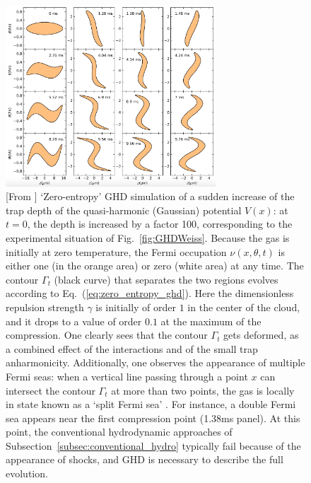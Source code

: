 \documentclass[onecolumn,amsfonts,showpacs,superscriptaddress]{revtex4-1}
\begin{document}
\begin{figure}
    \centering
    \includegraphics[width=0.7\textwidth]{figures/fermi_contour.png}
    \caption{[From \citep{malvania2020generalized}] `Zero-entropy' GHD simulation of a sudden increase of the trap depth of the quasi-harmonic (Gaussian) potential $V(x)$: at $t=0$, the depth is increased by a factor 100, corresponding to the experimental situation of Fig.~\ref{fig:GHDWeiss}. Because the gas is initially at zero temperature, the Fermi occupation $\nu(x,\theta,t)$ is either one (in the orange area) or zero (white area) at any time. The contour $\Gamma_t$ (black curve) that separates the two regions evolves according to Eq.~(\ref{eq:zero_entropy_ghd}). Here the dimensionless repulsion strength $\gamma$ is initially of order $1$ in the center of the cloud, and it drops to a value of order $0.1$ at the maximum of the compression. One clearly sees that the contour $\Gamma_t$ gets deformed, as a combined effect of the interactions and of the small trap anharmonicity. Additionally, one observes the appearance of multiple Fermi seas: when a vertical line passing through a point $x$ can intersect the contour $\Gamma_t$ at more than two points, the gas is locally in state known as a `split Fermi sea' \citep{fokkema2014split,eliens2016general,eliens2017quantum}. For instance, a double Fermi sea appears near the first compression point (1.38ms panel). At this point, the conventional hydrodynamic approaches of Subsection~\ref{subsec:conventional_hydro} typically fail because of the appearance of shocks, and GHD is necessary to describe the full evolution. 
    }
    \label{fig:fermi_contour}
\end{figure}
\end{document}
